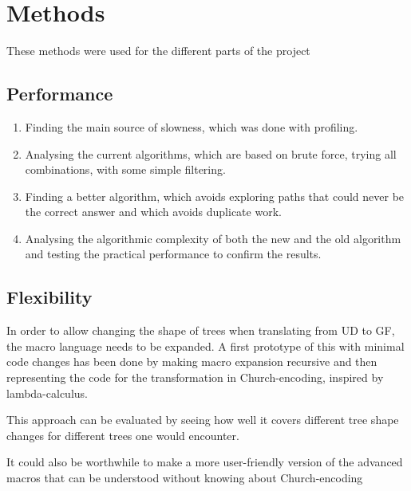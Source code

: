 \chapter{Methods}



These methods were used for the different parts of the project

\section{Performance}

\begin{enumerate}
    \item 
Finding the main source of slowness, which was done with profiling.
    \item 
Analysing the current algorithms, which are based on brute force, trying all combinations, with some simple filtering.
    \item 
Finding a better algorithm, which avoids exploring paths that could never be the correct answer and which avoids duplicate work.
    \item 
Analysing the algorithmic complexity of both the new and the old algorithm and testing the practical performance to confirm the results.
\end{enumerate}

\section{Flexibility}

In order to allow changing the shape of trees when translating from UD to GF, the macro language needs to be expanded.
A first prototype of this with minimal code changes has been done by making macro expansion recursive and then representing the code for the transformation in Church-encoding, inspired by lambda-calculus.

This approach can be evaluated by seeing how well it covers different tree shape changes for different trees one would encounter.

It could also be worthwhile to make a more user-friendly version of the advanced macros that can be understood without knowing about Church-encoding

